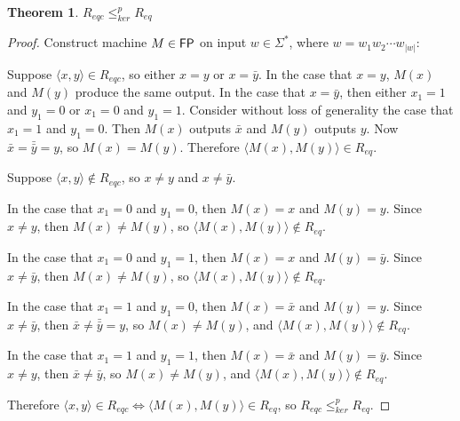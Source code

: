 \documentclass{article}
\newtheorem{theorem}{Theorem}[section]
\theoremstyle{definition} \newtheorem{definition}[definition]{Definition}
\newcommand{\sigmastar}{\Sigma^{*}} %
\newcommand{\kr}{\leq^{p}_{ker}} %
\newcommand{\pair}[2]{\langle#1,#2\rangle} %
\begin{document}
\begin{theorem}\label{thm:reqi_req}$R_{eqc}\kr R_{eq}$\end{theorem}
\begin{proof}
  Construct machine $M\in{\ensuremath{\mathsf{FP}}}$ on input $w\in\sigmastar$, where
  $w=w_1w_2\cdots w_{|w|}$:\\
  \begin{algorithm}[H]
  \end{algorithm}
  
  Suppose $\pair{x}{y}\in R_{eqc}$, so either $x=y$ or $x=\bar{y}$. In the case
  that $x=y$, $M(x)$ and $M(y)$ produce the same output. In the case that
  $x=\bar{y}$, then either $x_1=1$ and $y_1=0$ or $x_1=0$ and $y_1=1$. Consider
  without loss of generality the case that $x_1=1$ and $y_1=0$. Then $M(x)$
  outputs $\bar{x}$ and $M(y)$ outputs $y$. Now $\bar{x}=\bar{\bar{y}}=y$, so
  $M(x)=M(y)$. Therefore $\pair{M(x)}{M(y)}\in R_{eq}$.

  Suppose $\pair{x}{y}\notin R_{eqc}$, so $x\neq y$ and $x\neq\bar{y}$. 

  In the case that $x_1=0$ and $y_1=0$, then $M(x)=x$ and $M(y)=y$. Since
  $x\neq y$, then $M(x)\neq M(y)$, so $\pair{M(x)}{M(y)}\notin R_{eq}$.

  In the case that $x_1=0$ and $y_1=1$, then $M(x)=x$ and $M(y)=\bar{y}$. Since
  $x\neq\bar{y}$, then $M(x)\neq M(y)$, so $\pair{M(x)}{M(y)}\notin R_{eq}$.

  In the case that $x_1=1$ and $y_1=0$, then $M(x)=\bar{x}$ and $M(y)=y$. Since
  $x\neq\bar{y}$, then $\bar{x}\neq \bar{\bar{y}}=y$, so $M(x)\neq M(y)$, and
  $\pair{M(x)}{M(y)}\notin R_{eq}$. 

  In the case that $x_1=1$ and $y_1=1$, then $M(x)=\bar{x}$ and
  $M(y)=\bar{y}$. Since $x\neq y$, then $\bar{x}\neq\bar{y}$, so $M(x)\neq
  M(y)$, and $\pair{M(x)}{M(y)}\notin R_{eq}$.

  Therefore $\pair{x}{y}\in R_{eqc}\iff \pair{M(x)}{M(y)}\in R_{eq}$, so
  $R_{eqc}\kr R_{eq}$.
\end{proof}
\end{document}

